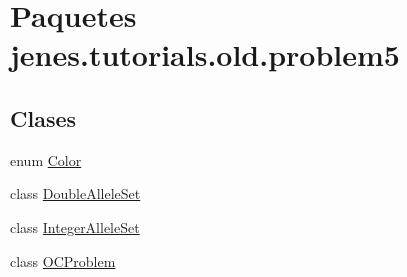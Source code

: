 \hypertarget{namespacejenes_1_1tutorials_1_1old_1_1problem5}{\section{Paquetes jenes.\-tutorials.\-old.\-problem5}
\label{namespacejenes_1_1tutorials_1_1old_1_1problem5}
}
\subsection*{Clases}
\begin{DoxyCompactItemize}
\item 
enum \hyperlink{enumjenes_1_1tutorials_1_1old_1_1problem5_1_1_color}{Color}
\item 
class \hyperlink{classjenes_1_1tutorials_1_1old_1_1problem5_1_1_double_allele_set}{Double\-Allele\-Set}
\item 
class \hyperlink{classjenes_1_1tutorials_1_1old_1_1problem5_1_1_integer_allele_set}{Integer\-Allele\-Set}
\item 
class \hyperlink{classjenes_1_1tutorials_1_1old_1_1problem5_1_1_o_c_problem}{O\-C\-Problem}
\end{DoxyCompactItemize}
